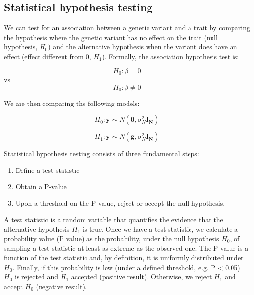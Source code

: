 
\newpage

\subsection{Statistical hypothesis testing}

We can test for an association between a genetic variant and a trait by comparing the hypothesis where the genetic variant has no effect on the trait (null hypothesis, $H_0$) and the alternative hypothesis when the variant does have an effect (effect different from 0, $H_1$).
Formally, the association hypothesis test is:

\begin{equation}\label{eq14:null_hypothesis}
 H_{0}: \beta=0 
\end{equation}
vs
\begin{equation}\label{eq15:alternative_hypothesis}
 H_{0}: \beta \neq 0 
\end{equation}

We are then comparing the following models:

\begin{equation}\label{eq16:null_hypothesis_regression}
 H_0: \mathbf{y} \sim N(\mathbf{0}, \sigma_N^{2} \mathbf{I_N}) 
\end{equation}

\begin{equation}\label{eq17:alternative_hypothesis_regression}
 H_1: \mathbf{y} \sim N(\mathbf{g},\sigma_N^{2} \mathbf{I_N}) 
\end{equation}

Statistical hypothesis testing consists of three fundamental steps:
\begin{enumerate}
  \item Define a test statistic
  \item Obtain a P-value
  \item Upon a threshold on the P-value, reject or accept the null hypothesis. 
\end{enumerate}

A test statistic is a random variable that quantifies the evidence that the alternative hypothesis $H_1$ is true. 
Once we have a test statistic, we calculate a probability value (P value) as the probability, under the null hypothesis $H_0$, of sampling a test statistic at least as extreme as the observed one. 
The P value is a function of the test statistic and, by definition, it is uniformly distributed under $H_0$.
Finally, if this probability is low (under a defined threshold, e.g. P < 0.05) $H_0$ is rejected and $H_1$ accepted (positive result).
Otherwise, we reject $H_1$ and accept $H_0$ (negative result).\\

